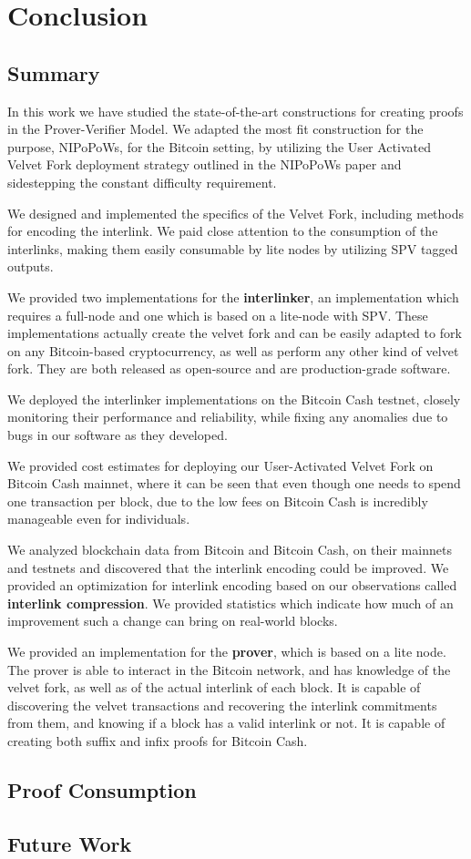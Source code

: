 \chapter{Conclusion}

\section{Summary}
In this work we have studied the state-of-the-art constructions for creating proofs in the Prover-Verifier Model. We adapted the most fit construction for the purpose, NIPoPoWs, for the Bitcoin setting, by utilizing the User Activated Velvet Fork deployment strategy outlined in the NIPoPoWs paper and sidestepping the constant difficulty requirement.


We designed and implemented the specifics of the Velvet Fork, including methods for encoding the interlink. We paid close attention to the consumption of the interlinks, making them easily consumable by lite nodes by utilizing SPV tagged outputs.

We provided two implementations for the \textbf{interlinker}, an implementation which requires a full-node and one which is based on a lite-node with SPV. These implementations actually create the velvet fork and can be easily adapted to fork on any Bitcoin-based cryptocurrency, as well as perform any other kind of velvet fork. They are both released as open-source and are production-grade software.

We deployed the interlinker implementations on the Bitcoin Cash testnet, closely monitoring their performance and reliability, while fixing any anomalies due to bugs in our software as they developed. 

We provided cost estimates for deploying our User-Activated Velvet Fork on Bitcoin Cash mainnet, where it can be seen that even though one needs to spend one transaction per block, due to the low fees on Bitcoin Cash is incredibly manageable even for individuals.

We analyzed blockchain data from Bitcoin and Bitcoin Cash, on their mainnets and testnets and discovered that the interlink encoding could be improved. We provided an optimization for interlink encoding based on our observations called \textbf{interlink compression}. We provided statistics which indicate how much of an improvement such a change can bring on real-world blocks.

We provided an implementation for the \textbf{prover}, which is based on a lite node. The prover is able to interact in the Bitcoin network, and has knowledge of the velvet fork, as well as of the actual interlink of each block. It is capable of discovering the velvet transactions and recovering the interlink commitments from them, and knowing if a block has a valid interlink or not. It is capable of creating both suffix and infix proofs for Bitcoin Cash.

\section{Proof Consumption}
\section{Future Work}
